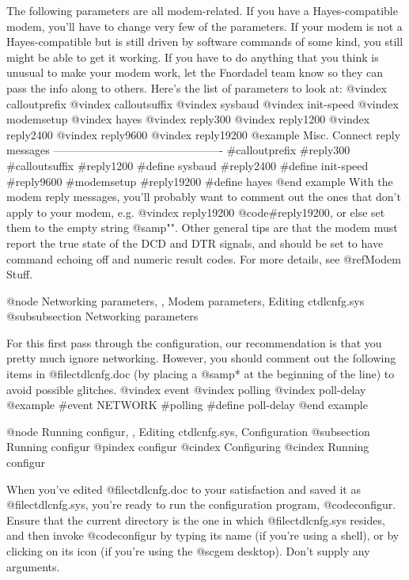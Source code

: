 The following parameters are all modem-related.  If
you have a Hayes-compatible modem, you'll have to change very
few of the parameters.  If your modem is not a Hayes-compatible
but is still driven by software commands of some
kind, you still might be able to get it working.  If you have
to do anything that you think is unusual to make your modem
work, let the Fnordadel team know so they can pass the info
along to others.  Here's the list of parameters to look at:
@vindex calloutprefix
@vindex calloutsuffix
@vindex sysbaud
@vindex init-speed
@vindex modemsetup
@vindex hayes
@vindex reply300
@vindex reply1200
@vindex reply2400
@vindex reply9600
@vindex reply19200
@example
Misc.                   Connect reply messages
----------------------------------------------
#calloutprefix          #reply300
#calloutsuffix          #reply1200
#define sysbaud         #reply2400
#define init-speed      #reply9600
#modemsetup             #reply19200
#define hayes
@end example
With the modem reply messages, you'll probably want
to comment out the ones that don't apply to your modem, e.g.
@vindex reply19200
@code{#reply19200}, or else set them to the empty string @samp{""}.  Other
general tips are that the modem must report the true state of
the DCD and DTR signals, and should be set to have command
echoing off and numeric result codes.  For more details, see @ref{Modem Stuff}.

@node Networking parameters,  , Modem parameters, Editing ctdlcnfg.sys
@subsubsection Networking parameters

For this first pass through the configuration, our recommendation is that
you pretty much ignore networking.  However, you should comment out the
following items in @file{ctdlcnfg.doc} (by placing a @samp{*} at the
beginning of the line) to avoid possible glitches.
@vindex event
@vindex polling
@vindex poll-delay
@example
#event NETWORK
#polling
#define poll-delay
@end example

@node Running configur,  , Editing ctdlcnfg.sys, Configuration
@subsection Running configur
@pindex configur
@cindex Configuring
@cindex Running configur

When you've edited @file{ctdlcnfg.doc} to your satisfaction and saved it
as @file{ctdlcnfg.sys}, you're ready to run the configuration program,
@code{configur}.  Ensure that the current directory is the one in which
@file{ctdlcnfg.sys} resides, and then invoke @code{configur} by typing its
name (if you're using a shell), or by clicking on its icon (if you're using
the @sc{gem} desktop).  Don't supply any arguments.

